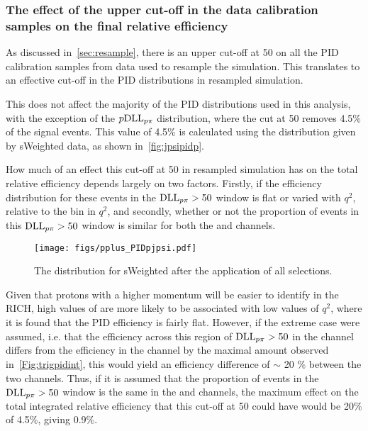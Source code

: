 
\subsubsection{The effect of the upper cut-off in the data calibration samples on the final relative efficiency}
\label{sec:cutpid}
As discussed in~\autoref{sec:resample}, there is an upper cut-off at 50 on all the PID calibration samples from data used to resample the simulation. This translates to an effective cut-off in the PID distributions in resampled simulation.%

This does not affect the majority of the PID distributions used in this analysis, with the exception of the $p\mathrm{DLL}_{{p}{\pi}}$ distribution, where the cut at 50 removes 4.5\% of the \Lbpijpsi signal events. This value of 4.5\% is calculated using the \dllppi distribution given by sWeighted \Lbpijpsi data, as shown in~\autoref{fig:jpsipidp}.

How much of an effect this cut-off at 50 in resampled simulation has on the total relative efficiency depends largely on two factors. Firstly, if the efficiency distribution for these events in the $\mathrm{DLL}_{{p}{\pi}}>50$ window is flat or varied with $q^{2}$, relative to the \jpsi bin in $q^{2}$, and secondly, whether or not the proportion of events in this $\mathrm{DLL}_{{p}{\pi}}>50$ window is similar for both the \Lbpi and \Lbpijpsi channels.

\begin{figure}[h!]
  \def\nh{0.7\textwidth}
  \centering
  \texttt{[image: figs/pplus\_PIDpjpsi.pdf]}
  \caption{The \dllppi distribution for sWeighted \Lbpijpsi after the application of all selections.}
  \label{fig:jpsipidp}
  \end{figure}

Given that protons with a higher momentum will be easier to identify in the RICH, high values of \dllppi are more likely to be associated with low values of $q^{2}$, where it is found that the PID efficiency is fairly flat. However, if the extreme case were assumed, i.e. that the efficiency across this region of $\mathrm{DLL}_{{p}{\pi}}>50$ in the \Lbpi channel differs from the efficiency in the \Lbpijpsi channel by the maximal amount observed in~\autoref{Fig:trigpidint}, this would yield an efficiency difference of $\sim$ 20 \% between the two channels. Thus, if it is assumed that the proportion of events in the $\mathrm{DLL}_{{p}{\pi}}>50$ window is the same in the \Lbpi and \Lbpijpsi channels, the maximum effect on the total integrated relative efficiency that this cut-off at 50 could have would be 20\% of 4.5\%, giving 0.9\%.

